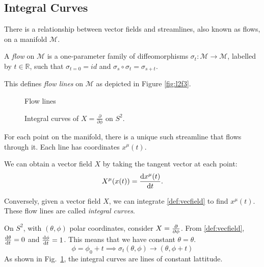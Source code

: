 \subsection{Integral Curves}%
\label{sub:integral_curves}

There is a relationship between vector fields and streamlines, also known as flows, on a manifold $\mathcal{M}$.

\begin{definition}[flow]
  A \emph{flow} on $\mathcal{M}$ is a one-parameter family of diffeomorphisms $\sigma_t: \mathcal{M} \to \mathcal{M}$, labelled by $t \in \mathbb{R}$, such that $\sigma_{t = 0} = id$ and $\sigma_s \circ \sigma_t = \sigma_{s + t}.$ 
\end{definition}
This defines \emph{flow lines} on $\mathcal{M}$ as depicted in Figure \ref{fig:l2f3}.
\begin{figure}[tbhp]
  \centering
  \begin{minipage}[t]{0.5\textwidth}
    \centering
    \def\svgwidth{0.9\columnwidth}
    
    \caption{Flow lines}
    \label{fig:l2f3}
  \end{minipage}%
  \begin{minipage}[t]{0.5\textwidth}
    \centering
    \def\svgwidth{0.6\columnwidth}
    
    \caption{Integral curves of $X = \frac{\partial }{\partial \phi}$  on $S^2$.}
    \label{fig:l2f4}
  \end{minipage}
\end{figure}
For each point on the manifold, there is a unique such streamline that flows through it.
Each line has coordinates $x^\mu(t)$.

We can obtain a vector field $X$ by taking the tangent vector at each point:
 \begin{equation}
   \label{def:vecfield}
   X^\mu(x(t)) = \dv{x^\mu(t)}{t}.
\end{equation}
\begin{definition}
  Conversely, given a vector field $X$, we can integrate \eqref{def:vecfield} to find $x^\mu(t)$.
  These flow lines are called \emph{integral curves}.
\end{definition}

\begin{example}[]
  On $S^2$, with $(\theta, \phi)$ polar coordinates, consider $X = \pdv{}{\phi}$.
  From \eqref{def:vecfield}, $\dv{\theta}{t} = 0$ and $\dv{\phi}{t} = 1$. This means that we have constant $\theta = \theta$.
  \begin{equation}
    \phi = \phi_0 + t \implies \sigma_t (\theta, \phi) \rightarrow (\theta, \phi + t)
  \end{equation}
  As shown in Fig.~\ref{fig:l2f4}, the integral curves are lines of constant lattitude.
\end{example}
